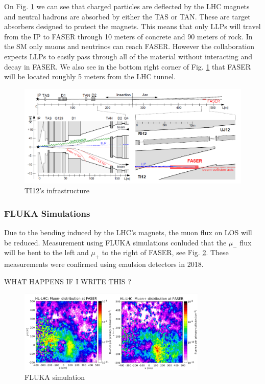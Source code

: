 On Fig. \ref{fig:infrastructure} we can see that charged particles are deflected by the LHC magnets and neutral hadrons are absorbed by either the TAS or TAN. These are target absorbers designed to protect the magnets. This means that only LLPs will travel from the IP to FASER through 10 meters of concrete and 90 meters of rock. In the SM only muons and neutrinos can reach FASER. However the collaboration expects LLPs to easily pass through all of the material without interacting and decay in FASER. We also see in the bottom right corner of Fig. \ref{fig:infrastructure} that FASER will be located roughly 5 meters from the LHC tunnel.

\begin{figure}[htbp!] 
\centering    
\includegraphics[width=1.0\textwidth]{FASERinfrastructureTI12.png}
\caption[TI12 infrastructure]{TI12's infrastructure}
\label{fig:infrastructure}
\end{figure}

\subsubsection{FLUKA Simulations}

Due to the bending induced by the LHC's magnets, the muon flux on LOS will be reduced. Measurement using FLUKA simulations conluded that the $\mu_{-}$ flux will be bent to the left and $\mu_{+}$ to the right of FASER, see Fig. \ref{fig:FLUKA}. These measurements were confirmed using emulsion detectors in 2018.

WHAT HAPPENS IF I WRITE THIS ?

\begin{figure}[htbp!] 
\centering    
\includegraphics[width=0.8\textwidth]{FLUKA.png}
\caption[FLUKA]{FLUKA simulation}
\label{fig:FLUKA}
\end{figure}

